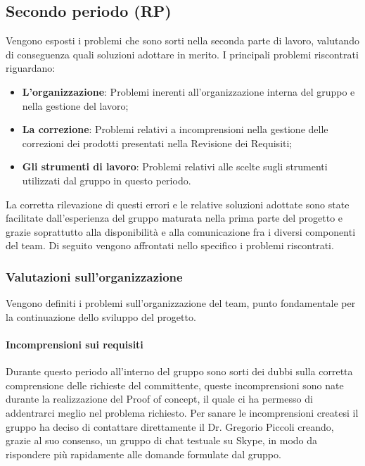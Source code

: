 \documentclass[../piano-di-qualifica.tex]{subfiles}
\begin{document}
\subsection{Secondo periodo (RP)}
Vengono esposti i problemi che sono sorti nella seconda parte di lavoro, valutando di conseguenza quali soluzioni adottare in merito.
I principali problemi riscontrati riguardano:
\begin{itemize}
    \item \textbf{L'organizzazione}: Problemi inerenti all'organizzazione interna del gruppo e nella gestione del lavoro;
    \item \textbf{La correzione}: Problemi relativi a incomprensioni nella gestione delle correzioni dei prodotti presentati nella Revisione dei Requisiti;
    \item \textbf{Gli strumenti di lavoro}: Problemi relativi alle scelte sugli strumenti utilizzati dal gruppo in questo periodo.
\end{itemize}
La corretta rilevazione di questi errori e le relative soluzioni adottate sono state facilitate dall'esperienza del gruppo maturata nella prima parte del progetto e grazie soprattutto alla disponibilità e alla comunicazione fra i diversi componenti del team.
Di seguito vengono affrontati nello specifico i problemi riscontrati.

\subsubsection{Valutazioni sull’organizzazione}
\label{sssec:valutazioni_organizzazione}
Vengono definiti i problemi sull'organizzazione del team, punto fondamentale per la continuazione dello sviluppo del progetto.

\paragraph{Incomprensioni sui requisiti}
\label{sub:incomprensioni_sui_requisiti}
Durante questo periodo all'interno del gruppo sono sorti dei dubbi sulla corretta comprensione delle richieste del committente, queste incomprensioni sono nate durante la realizzazione del Proof of concept, il quale ci ha permesso di addentrarci meglio nel problema richiesto.
Per sanare le incomprensioni createsi il gruppo ha deciso di contattare direttamente il Dr. Gregorio Piccoli creando, grazie al suo consenso, un gruppo di chat testuale su Skype, in modo da rispondere più rapidamente alle domande formulate dal gruppo. 
\end{document}
